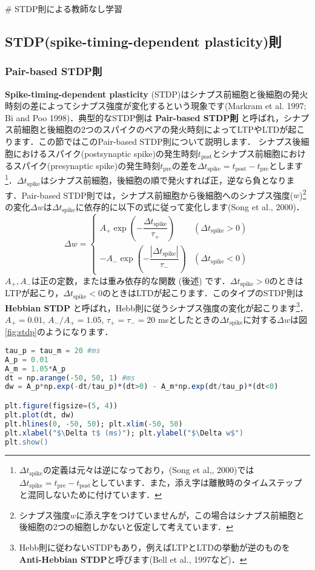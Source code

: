 # STDP則による教師なし学習
\subsection{STDP(spike-timing-dependent plasticity)則}
\subsubsection{Pair-based STDP則}
\textbf{Spike-timing-dependent plasticity} (STDP)はシナプス前細胞と後細胞の発火時刻の差によってシナプス強度が変化するという現象です(Markram et al. 1997; Bi and Poo 1998)．典型的なSTDP側は \textbf{Pair-based STDP則} と呼ばれ，シナプス前細胞と後細胞の2つのスパイクのペアの発火時刻によってLTPやLTDが起こります．この節ではこのPair-based STDP則について説明します．
シナプス後細胞におけるスパイク(postsynaptic spike)の発生時刻$t_\text{post}$とシナプス前細胞におけるスパイク(presynaptic spike)の発生時刻$t_\text{pre}$の差を$\Delta t_{\text{spike}}=t_\text{post}-t_\text{pre}$とします\footnote{$\Delta t_{\text{spike}}$の定義は元々は逆になっており，(Song et al,, 2000)では$\Delta t_{\text{spike}}=t_\text{pre}-t_\text{post}$としています．また，添え字は離散時のタイムステップと混同しないために付けています．}．$\Delta t_{\text{spike}}$はシナプス前細胞，後細胞の順で発火すれば正，逆なら負となります．Pair-based STDP則では，シナプス前細胞から後細胞へのシナプス強度($w$)\footnote{シナプス強度$w$に添え字をつけていませんが，この場合はシナプス前細胞と後細胞の2つの細胞しかないと仮定して考えています．}の変化$\Delta w$は$\Delta t_{\text{spike}}$に依存的に以下の式に従って変化します(Song et al., 2000)．
\begin{equation}
\Delta w = \begin{cases}
A_{+} \exp\left(-\dfrac{\Delta t_{\text{spike}}}{\tau_{+}}\right) &(\Delta t_{\text{spike}}> 0) \\
-A_{-} \exp\left(-\dfrac{|\Delta t_{\text{spike}}|}{\tau_{-}}\right) &(\Delta t_{\text{spike}}< 0)
\end{cases}
\end{equation}
$A_+, A_-$は正の定数，または重み依存的な関数 (後述) です．$\Delta t_{\text{spike}}>0$のときはLTPが起こり，$\Delta t_{\text{spike}}<0$のときはLTDが起こります．このタイプのSTDP則は\textbf{Hebbian STDP} と呼ばれ，Hebb則に従うシナプス強度の変化が起こります\footnote{Hebb則に従わないSTDPもあり，例えばLTPとLTDの挙動が逆のものを\textbf{Anti-Hebbian STDP}と呼びます(Bell et al., 1997など)．}．
$A_+=0.01$, $A_-/A_+=1.05$, $\tau_{+}=\tau_{-}=20$ msとしたときの$\Delta t_{\text{spike}}$に対する$\Delta w$は図\ref{fig:stdp}のようになります．
\begin{lstlisting}[language=julia]
tau_p = tau_m = 20 #ms
A_p = 0.01
A_m = 1.05*A_p
dt = np.arange(-50, 50, 1) #ms
dw = A_p*np.exp(-dt/tau_p)*(dt>0) - A_m*np.exp(dt/tau_p)*(dt<0) 

plt.figure(figsize=(5, 4))
plt.plot(dt, dw)
plt.hlines(0, -50, 50); plt.xlim(-50, 50)
plt.xlabel("$\Delta t$ (ms)"); plt.ylabel("$\Delta w$")
plt.show()
\end{lstlisting}
